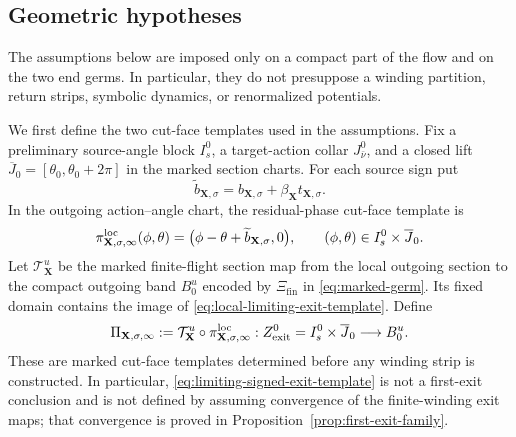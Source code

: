 \documentclass[11pt]{amsart}
\numberwithin{equation}{section}
\theoremstyle{definition}
\theoremstyle{remark}
\begin{document}
\subsection{Geometric hypotheses}

The assumptions below are imposed only on a compact part of the flow and
on the two end germs.  In particular, they do not presuppose a winding
partition, return strips, symbolic dynamics, or renormalized potentials.

We first define the two cut-face templates used in the assumptions.  Fix
a preliminary source-angle block $I_s^0$, a target-action collar
$J_{\bar\nu}^0$, and a closed lift
$\overline J_0=[\theta_0,\theta_0+2\pi]$ in the marked section charts.
For each source sign put
\begin{equation}\label{eq:limiting-phase-offset}
 \widetilde b_{\mathbf X,\sigma}
 =b_{\mathbf X,\sigma}
   +\beta_{\mathbf X}t_{\mathbf X,\sigma}.
\end{equation}
In the outgoing action--angle chart, the residual-phase cut-face template
is
\begin{equation}\label{eq:local-limiting-exit-template}
 \pi^{\rm loc}_{\mathbf X,\sigma,\infty}(\phi,\theta)
 =\bigl(\phi-\theta+\widetilde b_{\mathbf X,\sigma},0\bigr),
 \qquad (\phi,\theta)\in I_s^0\times\overline J_0.
\end{equation}
Let $\mathcal T^u_{\mathbf X}$ be the marked finite-flight section map from
the local outgoing section to the compact outgoing band $B_0^u$ encoded by
$\Xi_{\mathrm{fin}}$ in \eqref{eq:marked-germ}.  Its fixed domain contains
the image of \eqref{eq:local-limiting-exit-template}.  Define
\begin{equation}\label{eq:limiting-signed-exit-template}
 \Pi_{\mathbf X,\sigma,\infty}
 :=\mathcal T^u_{\mathbf X}\circ
    \pi^{\rm loc}_{\mathbf X,\sigma,\infty}:
 Z_{\rm exit}^0=I_s^0\times\overline J_0\longrightarrow B_0^u.
\end{equation}
These are marked cut-face templates determined before any winding strip is
constructed.  In particular, \eqref{eq:limiting-signed-exit-template} is
not a first-exit conclusion and is not defined by assuming convergence of
the finite-winding exit maps; that convergence is proved in
Proposition~\ref{prop:first-exit-family}.
\end{document}
